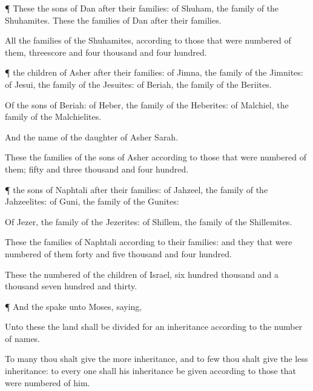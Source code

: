{\par }{\PP {}¶ These
{} the
sons of
Dan after their
families: of
Shuham, the
family of the
Shuhamites. These
{} the
families of
Dan after their
families.

All the
families of the
Shuhamites, according to those that were
numbered of them,
{}
threescore and
four
thousand and
four
hundred.


\par }{\PP {}¶
{} the
children of
Asher after their
families: of
Jimna, the
family of the
Jimnites: of
Jesui, the
family of the
Jesuites: of
Beriah, the
family of the
Beriites.

Of the
sons of
Beriah: of
Heber, the
family of the
Heberites: of
Malchiel, the
family of the
Malchielites.

And the
name of the
daughter of
Asher
{}
Sarah.

These
{} the
families of the
sons of
Asher according to those that were
numbered of them;
{}
fifty and
three
thousand and
four
hundred.


\par }{\PP {}¶
{} the
sons of
Naphtali after their
families: of
Jahzeel, the
family of the
Jahzeelites: of
Guni, the
family of the
Gunites:

Of
Jezer, the
family of the
Jezerites: of
Shillem, the
family of the
Shillemites.

These
{} the
families of
Naphtali according to their
families: and they that were
numbered of them
{}
forty and
five
thousand and
four
hundred.

These
{} the
numbered of the
children of
Israel,
six
hundred
thousand and a
thousand
seven
hundred and
thirty.


\par }{\PP {}¶ And the
{}
spake unto
Moses,
saying,

Unto these the
land shall be
divided for an
inheritance according to the
number of
names.

To
many thou shalt give the
more
inheritance, and to
few thou shalt give the
less
inheritance: to every
one shall his
inheritance be
given
according to those that were
numbered of him.

}
